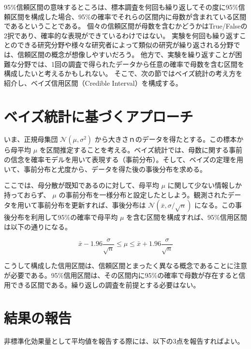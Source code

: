 \documentclass[
  ja=standard, xelatex, base=12pt]{bxjsreport}
\begin{document}
95\%信頼区間の意味するところは、標本調査を何回も繰り返してその度に95\%信頼区間を構成した場合、95\%の確率でそれらの区間内に母数が含まれている区間であるということである。 個々の信頼区間が母数を含むかどうかはTrue/Falseの2択であり、確率的な表現ができているわけではない。 実験を何回も繰り返すことのできる研究分野や様々な研究者によって類似の研究が繰り返される分野では、信頼区間の概念が想像しやすいだろう。 他方で、実験を繰り返すことが困難な分野では、1回の調査で得られたデータから任意の確率で母数を含む区間を構成したいと考えるかもしれない。 そこで、次の節ではベイズ統計の考え方を紹介し、ベイズ信用区間（Credible Interval）を構成する。

\hypertarget{ux30d9ux30a4ux30baux7d71ux8a08ux306bux57faux3065ux304fux30a2ux30d7ux30edux30fcux30c1}{%
\section{ベイズ統計に基づくアプローチ}\label{ux30d9ux30a4ux30baux7d71ux8a08ux306bux57faux3065ux304fux30a2ux30d7ux30edux30fcux30c1}}

いま、正規母集団 \(\mathcal{N}(\mu, \sigma^2)\) から大きさｎのデータを得たとする。この標本から母平均 \(\mu\) を区間推定することを考える。ベイズ統計では、母数に関する事前の信念を確率モデルを用いて表現する（事前分布）。そして、ベイズの定理を用いて、事前分布と尤度から、データを得た後の事後分布を求める。

ここでは、母分散が既知であるのに対して、母平均 \(\mu\) に関して少ない情報しか持っておらず、 \(\mu\) の事前分布を一様分布と設定したとしよう。観測されたデータを用いて事前分布を更新すれば、事後分布は \(\mathcal{N}(\bar{x}, \sigma/\sqrt{n})\) になる。この事後分布を利用して95\%の確率で母平均 \(\mu\) を含む区間を構成すれば、95\%信用区間は以下の通りになる。

\[
\bar{x}-1.96\frac{\sigma}{\sqrt{n}}\leq\mu\leq\bar{x}+1.96\frac{\sigma}{\sqrt{n}}
\]

こうして構成した信用区間は、信頼区間とまったく異なる概念であることに注意が必要である。95\%信用区間は、その区間内に95\%の確率で母数が存在すると信用できる区間である。繰り返しの調査を前提とする必要はない。

\hypertarget{ux7d50ux679cux306eux5831ux544a}{%
\section{結果の報告}\label{ux7d50ux679cux306eux5831ux544a}}

非標準化効果量として平均値を報告する際には、以下の3点を報告すればよい。
\end{document}
